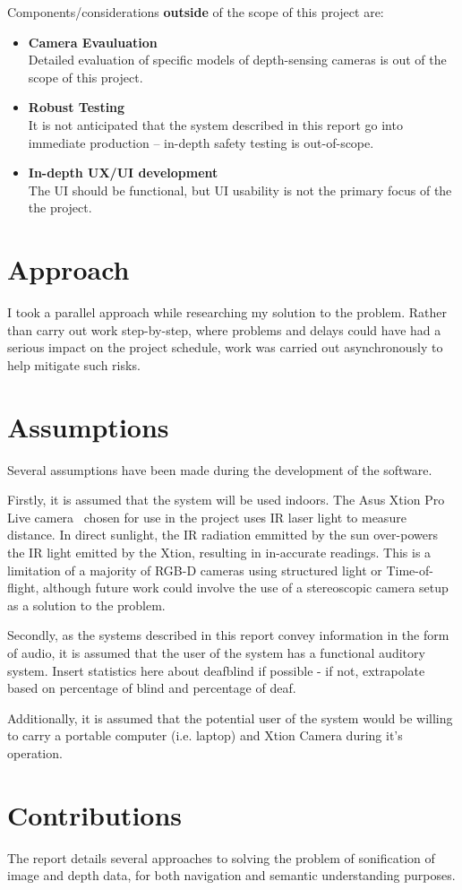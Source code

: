Components/considerations \textbf{outside} of the scope of this project are:
\begin{itemize}
    \item \textbf{Camera Evauluation} \hfill \\
        Detailed evaluation of specific models of depth-sensing cameras is out of the scope of this project. 
    \item \textbf{Robust Testing} \hfill \\
        It is not anticipated that the system described in this report go into immediate production -- in-depth safety testing is out-of-scope. 
    \item \textbf{In-depth UX/UI development} \hfill \\
        The UI should be functional, but UI usability is not the primary focus of the the project. 
\end{itemize}

\section{Approach}
I took a parallel approach while researching my solution to the problem. Rather than carry out work step-by-step, where problems and delays could have had a serious impact on the project schedule, work was carried out asynchronously to help mitigate such risks. 

\section{Assumptions}
Several assumptions have been made during the development of the software.

Firstly, it is assumed that the system will be used indoors. The Asus Xtion Pro Live camera~\cite{xtion} chosen for use in the project uses \ac{IR} laser light to measure distance. In direct sunlight, the \ac{IR} radiation emmitted by the sun over-powers the \ac{IR} light emitted by the Xtion, resulting in in-accurate readings. This is a limitation of a majority of \ac{RGB-D} cameras using structured light or Time-of-flight, although future work could involve the use of a stereoscopic camera setup as a solution to the problem.

Secondly, as the systems described in this report convey information in the form of audio, it is assumed that the user of the system has a functional auditory system. Insert statistics here about deafblind if possible - if not, extrapolate based on percentage of blind and percentage of deaf.

Additionally, it is assumed that the potential user of the system would be willing to carry a portable computer (i.e. laptop) and Xtion Camera during it's operation.

\section{Contributions}
The report details several approaches to solving the problem of sonification of image and depth data, for both navigation and semantic understanding purposes. 
